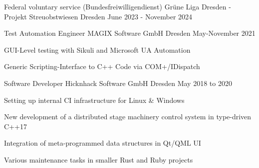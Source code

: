 
\begin{cventries}

  \cventry
    {Federal voluntary service (Bundesfreiwilligendienst)}
    {Grüne Liga Dresden - Projekt Streuobstwiesen}
    {Dresden}
    {June 2023 - November 2024}
    {
    }

  \cventry
    {Test Automation Engineer} %
    {MAGIX Software GmbH} %
    {Dresden} %
    {May-November 2021} %
    {
      \begin{cvitems} %
        \item {GUI-Level testing with Sikuli and Microsoft UA Automation}
        \item {Generic Scripting-Interface to C++ Code via COM+/IDispatch}
      \end{cvitems}
    }


  \cventry
    {Software Developer} %
    {Hicknhack Software GmbH} %
    {Dresden} %
    {May 2018 to 2020} %
    {
      \begin{cvitems} %
        \item {Setting up internal CI infrastructure for Linux \& Windows}
        \item {New development of a distributed stage machinery control system in type-driven C++17}
        \item {Integration of meta-programmed data structures in Qt/QML UI}
        \item {Various maintenance tasks in smaller Rust and Ruby projects}
      \end{cvitems}
    }




\end{cventries}
